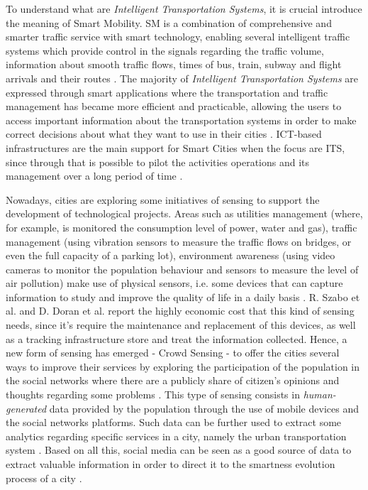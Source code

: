 To understand what are \textit{Intelligent Transportation Systems}, it is crucial introduce the meaning of Smart Mobility. SM is a combination of comprehensive and smarter traffic service with smart technology, enabling several intelligent traffic systems which provide control in the signals regarding the traffic volume, information about smooth traffic flows, times of bus, train, subway and flight arrivals and their routes \cite{kn:Chun2015}. The majority of \textit{Intelligent Transportation Systems} are expressed through smart applications where the transportation and traffic management has became more efficient and practicable, allowing the users to access important information about the transportation systems in order to make correct decisions about what they want to use in their cities \cite{kn:Caragliu2015}. ICT-based infrastructures are the main support for Smart Cities when the focus are ITS, since through that is possible to pilot the activities operations and its management over a long period of time \cite{kn:Cecilia2016}.

Nowadays, cities are exploring some initiatives of sensing to support the development of technological projects. Areas such as utilities management (where, for example, is monitored the consumption level of power, water and gas), traffic management (using vibration sensors to measure the traffic flows on bridges, or even the full capacity of a parking lot), environment awareness (using video cameras to monitor the population behaviour and sensors to measure the level of air pollution) make use of physical sensors, i.e. some devices that can capture information to study and improve the quality of life in a daily basis \cite{kn:Doran2015}. R. Szabo et al. \cite{kn:Szabo2013} and D. Doran et al. \cite{kn:Doran2015} report the highly economic cost that this kind of sensing needs, since it's require the maintenance and replacement of this devices, as well as a tracking infrastructure store and treat the information collected. Hence, a new form of sensing has emerged - Crowd Sensing - to offer the cities several ways to improve their services by exploring the participation of the population in the social networks where there are a publicly share of citizen's opinions and thoughts regarding some problems \cite{kn:Roitman2012}. This type of sensing consists in \textit{human-generated} data provided by the population through the use of mobile devices and the social networks platforms. Such data can be further used to extract some analytics regarding specific services in a city, namely the urban transportation system \cite{kn:Roitman2012}. Based on all this, social media can be seen as a good source of data to extract valuable information in order to direct it to the smartness evolution process of a city \cite{kn:Szabo2013}. 

